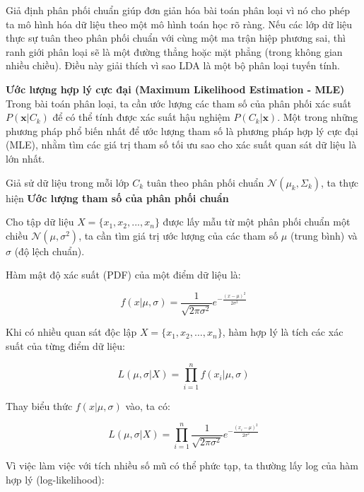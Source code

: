 Giả định phân phối chuẩn giúp đơn giản hóa bài toán phân loại vì nó cho phép ta mô hình hóa dữ liệu theo một mô hình toán học rõ ràng. Nếu các lớp dữ liệu thực sự tuân theo phân phối chuẩn với cùng một ma trận hiệp phương sai, thì ranh giới phân loại sẽ là một đường thẳng hoặc mặt phẳng (trong không gian nhiều chiều). Điều này giải thích vì sao LDA là một bộ phân loại tuyến tính.

\textbf{Ước lượng hợp lý cực đại (Maximum Likelihood Estimation - MLE)}  \\  
Trong bài toán phân loại, ta cần ước lượng các tham số của phân phối xác suất \( P(\mathbf{x} | C_k) \) để có thể tính được xác suất hậu nghiệm \( P(C_k | \mathbf{x}) \). Một trong những phương pháp phổ biến nhất để ước lượng tham số là phương pháp hợp lý cực đại (MLE), nhằm tìm các giá trị tham số tối ưu sao cho xác suất quan sát dữ liệu là lớn nhất.

Giả sử dữ liệu trong mỗi lớp \( C_k \) tuân theo phân phối chuẩn \( \mathcal{N}(\mu_k, \Sigma_k) \), ta thực hiện \textbf{Ước lượng tham số của phân phối chuẩn}  

Cho tập dữ liệu \( X = \{ x_1, x_2, ..., x_n \} \) được lấy mẫu từ một phân phối chuẩn một chiều \( \mathcal{N}(\mu, \sigma^2) \), ta cần tìm giá trị ước lượng của các tham số \( \mu \) (trung bình) và \( \sigma \) (độ lệch chuẩn).  

Hàm mật độ xác suất (PDF) của một điểm dữ liệu là:

\begin{equation}
f(x | \mu, \sigma) = \frac{1}{\sqrt{2\pi\sigma^2}} e^{-\frac{(x - \mu)^2}{2\sigma^2}}
\tag{2.2.4}
\end{equation}


Khi có nhiều quan sát độc lập \( X = \{x_1, x_2, \dots, x_n\} \), hàm hợp lý là tích các xác suất của từng điểm dữ liệu:

\begin{equation}
L(\mu, \sigma | X) = \prod_{i=1}^{n} f(x_i | \mu, \sigma)
\tag{2.2.5}
\end{equation}


Thay biểu thức \( f(x | \mu, \sigma) \) vào, ta có:

\begin{equation}
L(\mu, \sigma | X) = \prod_{i=1}^{n} \frac{1}{\sqrt{2\pi\sigma^2}} e^{-\frac{(x_i - \mu)^2}{2\sigma^2}}
\tag{2.2.6}
\end{equation}

Vì việc làm việc với tích nhiều số mũ có thể phức tạp, ta thường lấy log của hàm hợp lý (log-likelihood):

